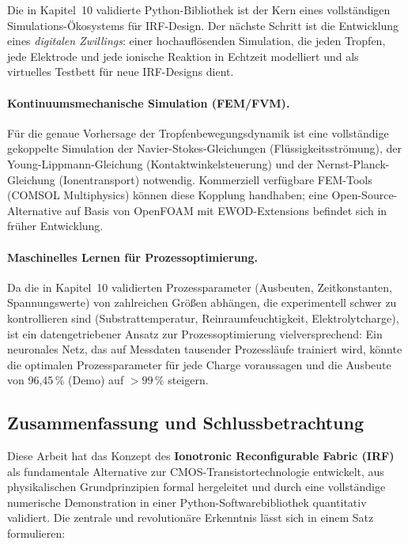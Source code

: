 ﻿\documentclass[a4paper,12pt]{scrreprt}
\theoremstyle{definition}
\begin{document}
Die in Kapitel~10 validierte Python-Bibliothek ist der Kern eines
vollständigen Simulations-Ökosystems für IRF-Design. Der nächste
Schritt ist die Entwicklung eines \emph{digitalen Zwillings}:
einer hochauflösenden Simulation, die jeden Tropfen, jede Elektrode
und jede ionische Reaktion in Echtzeit modelliert und als
virtuelles Testbett für neue IRF-Designs dient.

\paragraph{Kontinuumsmechanische Simulation (FEM/FVM).}
Für die genaue Vorhersage der Tropfenbewegungsdynamik ist eine
vollständige gekoppelte Simulation der Navier-Stokes-Gleichungen
(Flüssigkeitsströmung), der Young-Lippmann-Gleichung
(Kontaktwinkelsteuerung) und der Nernst-Planck-Gleichung
(Ionentransport) notwendig. Kommerziell verfügbare FEM-Tools
(COMSOL Multiphysics) können diese Kopplung handhaben;
eine Open-Source-Alternative auf Basis von OpenFOAM mit
EWOD-Extensions befindet sich in früher Entwicklung.

\paragraph{Maschinelles Lernen für Prozessoptimierung.}
Da die in Kapitel~10 validierten Prozessparameter (Ausbeuten,
Zeitkonstanten, Spannungswerte) von zahlreichen Größen abhängen,
die experimentell schwer zu kontrollieren sind (Substrattemperatur,
Reinraumfeuchtigkeit, Elektrolytcharge), ist ein datengetriebener
Ansatz zur Prozessoptimierung vielversprechend: Ein neuronales Netz,
das auf Messdaten tausender Prozessläufe trainiert wird, könnte
die optimalen Prozessparameter für jede Charge voraussagen und
die Ausbeute von 96,45\,\% (Demo) auf $>99\,\%$ steigern.

\subsection{Zusammenfassung und Schlussbetrachtung}
\label{sec:schluss}

Diese Arbeit hat das Konzept des \textbf{Ionotronic Reconfigurable Fabric (IRF)}
als fundamentale Alternative zur CMOS-Transistortechnologie entwickelt,
aus physikalischen Grundprinzipien formal hergeleitet und durch eine
vollständige numerische Demonstration in einer Python-Softwarebibliothek
quantitativ validiert. Die zentrale und revolutionäre Erkenntnis
lässt sich in einem Satz formulieren:
\end{document}
